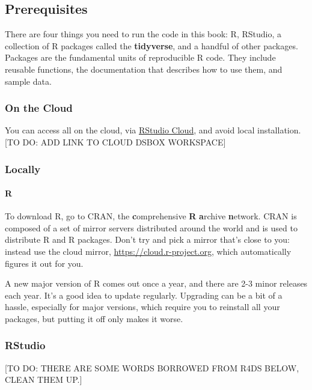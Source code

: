 \documentclass[]{article}
\let\oldparagraph\paragraph
\renewcommand{\paragraph}[1]{\oldparagraph{#1}\mbox{}}
\begin{document}
\subsection{Prerequisites}\label{prerequisites}

There are four things you need to run the code in this book: R, RStudio,
a collection of R packages called the \textbf{tidyverse}, and a handful
of other packages. Packages are the fundamental units of reproducible R
code. They include reusable functions, the documentation that describes
how to use them, and sample data.

\subsubsection{On the Cloud}\label{on-the-cloud}

You can access all on the cloud, via
\href{http://rstudio.cloud/}{RStudio Cloud}, and avoid local
installation. {[}TO DO: ADD LINK TO CLOUD DSBOX WORKSPACE{]}

\subsubsection{Locally}\label{locally}

\paragraph{R}\label{r}

To download R, go to CRAN, the \textbf{c}omprehensive \textbf{R}
\textbf{a}rchive \textbf{n}etwork. CRAN is composed of a set of mirror
servers distributed around the world and is used to distribute R and R
packages. Don't try and pick a mirror that's close to you: instead use
the cloud mirror, \url{https://cloud.r-project.org}, which automatically
figures it out for you.

A new major version of R comes out once a year, and there are 2-3 minor
releases each year. It's a good idea to update regularly. Upgrading can
be a bit of a hassle, especially for major versions, which require you
to reinstall all your packages, but putting it off only makes it worse.

\subsubsection{RStudio}\label{rstudio}

{[}TO DO: THERE ARE SOME WORDS BORROWED FROM R4DS BELOW, CLEAN THEM
UP.{]}
\end{document}

